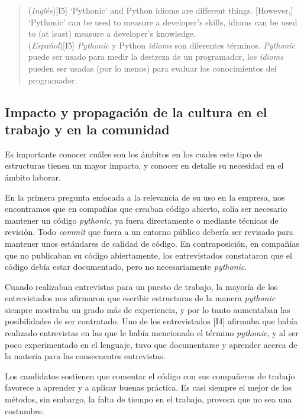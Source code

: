 \documentclass[a4paper, 12pt]{book}
\begin{document}
\begin{quote}
\small
    (\textit{Inglés})[I5] ‘Pythonic’ and Python idioms are different things. [However,] ‘Pythonic’ can be used to measure a developer’s skills, idioms can be used to (at least) measure a developer’s knowledge. \\
    (\textit{Español})[I5] \textit{Pythonic} y Python \textit{idioms} son diferentes términos. \textit{Pythonic} puede ser usado para medir la destreza de un programador, los \textit{idioms} pueden ser usadas (por lo menos) para evaluar los conocimientos del programador. 
\end{quote}

\subsection{Impacto y propagación de la cultura en el trabajo y en la comunidad}

Es importante conocer cuáles son los ámbitos en los cuales este tipo de estructuras tienen un mayor impacto, y conocer en detalle su necesidad en el ámbito laborar.

En la primera pregunta enfocada a la relevancia de su uso en la empresa, nos encontramos que en compañías que creaban código abierto, solía ser necesario mantener un código \textit{pythonic}, ya fuera directamente o mediante técnicas de revisión. Todo \textit{commit} que fuera a un entorno público debería ser revisado para mantener unos estándares de calidad de código. En contraposición, en compañías que no publicaban su código abiertamente, los entrevistados constataron que el código debía estar documentado, pero no necesariamente \textit{pythonic}.

Cuando realizaban entrevistas para un puesto de trabajo, la mayoría de los entrevistados nos afirmaron que escribir estructuras de la manera \textit{pythonic} siempre mostraba un grado más de experiencia, y por lo tanto aumentaban las posibilidades de ser contratado. Uno de los entrevistados [I4] afirmaba que había realizado entrevistas en las que le había mencionado el término \textit{pythonic}, y al ser poco experimentado en el lenguaje, tuvo que documentarse y aprender acerca de la materia para las consecuentes entrevistas.

Los candidatos sostienen que comentar el código con sus compañeros de trabajo favorece a aprender y a aplicar buenas práctica. Es casi siempre el mejor de los métodos, sin embargo, la falta de tiempo en el trabajo, provoca que no sea una costumbre.
\end{document}

